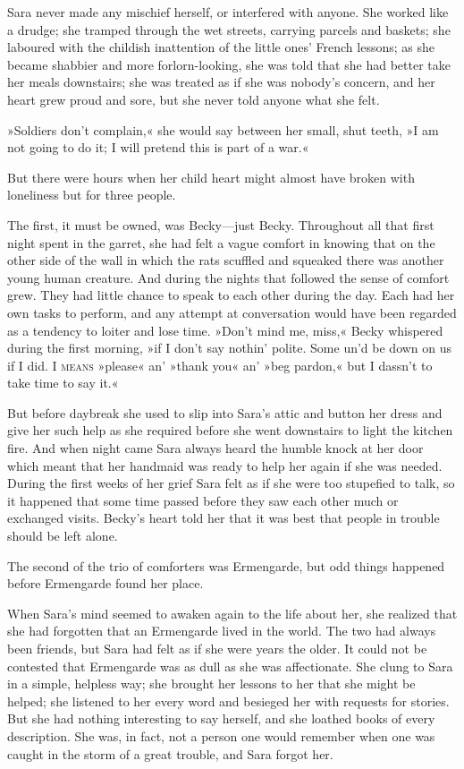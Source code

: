 Sara never made any mischief herself, or interfered with anyone. She worked like a drudge; she tramped through the wet streets, carrying parcels and baskets; she laboured with the childish inattention of the little ones' French lessons; as she became shabbier and more forlorn-looking, she was told that she had better take her meals downstairs; she was treated as if she was nobody's concern, and her heart grew proud and sore, but she never told anyone what she felt.

»Soldiers don't complain,« she would say between her small, shut teeth, »I am not going to do it; I will pretend this is part of a war.«

But there were hours when her child heart might almost have broken with loneliness but for three people.

The first, it must be owned, was Becky—just Becky. Throughout all that first night spent in the garret, she had felt a vague comfort in knowing that on the other side of the wall in which the rats scuffled and squeaked there was another young human creature. And during the nights that followed the sense of comfort grew. They had little chance to speak to each other during the day. Each had her own tasks to perform, and any attempt at conversation would have been regarded as a tendency to loiter and lose time. »Don't mind me, miss,« Becky whispered during the first morning, »if I don't say nothin' polite. Some un'd be down on us if I did. I \textsc{means} »please« an' »thank you« an' »beg pardon,« but I dassn't to take time to say it.«

But before daybreak she used to slip into Sara's attic and button her dress and give her such help as she required before she went downstairs to light the kitchen fire. And when night came Sara always heard the humble knock at her door which meant that her handmaid was ready to help her again if she was needed. During the first weeks of her grief Sara felt as if she were too stupefied to talk, so it happened that some time passed before they saw each other much or exchanged visits. Becky's heart told her that it was best that people in trouble should be left alone.

The second of the trio of comforters was Ermengarde, but odd things happened before Ermengarde found her place.

When Sara's mind seemed to awaken again to the life about her, she realized that she had forgotten that an Ermengarde lived in the world. The two had always been friends, but Sara had felt as if she were years the older. It could not be contested that Ermengarde was as dull as she was affectionate. She clung to Sara in a simple, helpless way; she brought her lessons to her that she might be helped; she listened to her every word and besieged her with requests for stories. But she had nothing interesting to say herself, and she loathed books of every description. She was, in fact, not a person one would remember when one was caught in the storm of a great trouble, and Sara forgot her.


